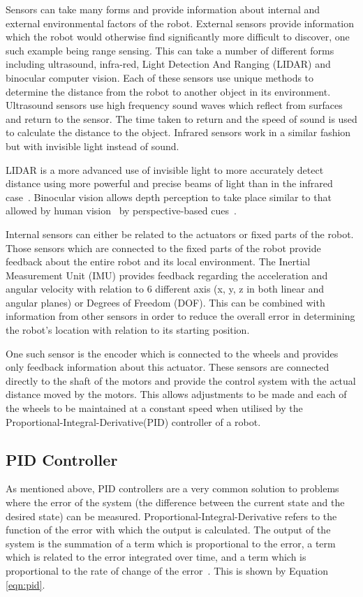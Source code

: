Sensors can take many forms and provide information about internal and external 
environmental factors of the robot. External sensors provide information which 
the robot would otherwise find significantly more difficult to discover, one 
such example being range sensing. This can take a number of different forms 
including ultrasound, infra-red, Light Detection And Ranging (LIDAR) and 
binocular computer vision. Each of these sensors use unique methods to determine 
the distance from the robot to another object in its environment. Ultrasound 
sensors use high frequency sound waves which reflect from surfaces and return 
to the sensor. The time taken to return and the speed of sound is used to 
calculate the distance to the object. Infrared sensors work in a similar 
fashion but with invisible light instead of sound. 

LIDAR is a more advanced use of invisible light to more accurately detect 
distance using more powerful and precise beams of light than in the infrared 
case~\cite{lidar}. Binocular vision allows depth perception to take place 
similar to that allowed by human vision~\cite{read2005early} by perspective-based cues~\cite{pfautz2002depth}. 

Internal sensors can either be related to the actuators or fixed parts of the 
robot. Those sensors which are connected to the fixed parts of the robot provide 
feedback about the entire robot and its local environment. The Inertial 
Measurement Unit (IMU) provides feedback regarding the acceleration and angular 
velocity with relation to 6 different axis (x, y, z in both linear and angular 
planes) or Degrees of Freedom (DOF). This can be combined with information from 
other sensors in order to reduce the overall error in determining the robot's 
location with relation to its starting position.  

One such sensor is the encoder which is connected to the wheels and provides 
only feedback information about this actuator. These sensors are connected 
directly to the shaft of the motors and provide the control system with the 
actual distance moved by the motors. This allows adjustments to be made and each 
of the wheels to be maintained at a constant speed when utilised by the 
Proportional-Integral-Derivative(PID) controller of a robot.  

\subsection{PID Controller}\label{litreview/robotics/pid}
As mentioned above, PID controllers are a very common solution to problems where the error of the 
system (the difference between the current state and the desired state) can be 
measured. Proportional-Integral-Derivative refers to the 
function of the error with which the output is calculated. The output of the 
system is the summation of a term which is proportional to the error, a term 
which is related to the error integrated over time, and a term which is 
proportional to the rate of change of the error~\cite{aastrom2006advanced}. This is shown by Equation \ref{eqn:pid}.


